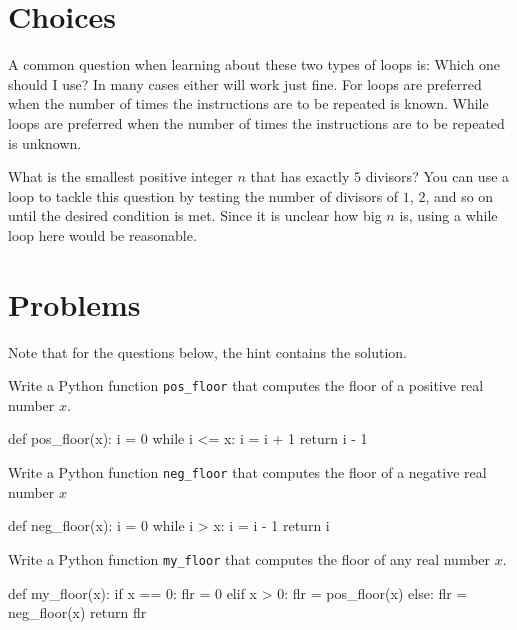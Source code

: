 \documentclass{ximera}
\begin{document}
\section{Choices}

A common question when learning about these two types of loops is: Which one should I use? In many cases either will work just fine. For loops are preferred when the number of times the instructions are to be repeated is known. While loops are preferred when the number of times the instructions are to be repeated is unknown.

What is the smallest positive integer $n$ that has exactly $5$ divisors? You can use a loop to tackle this question by testing the number of divisors of $1$, $2$, and so on until the desired condition is met. Since it is unclear how big $n$ is, using a while loop here would be reasonable.

\section{Problems}

Note that for the questions below, the hint contains the solution.

\begin{question}
	Write a Python function \verb|pos_floor| that computes the floor of a positive real number $x$.
\begin{hint}
\begin{sageCell}
def pos_floor(x):
        i = 0
        while i <= x:
                i = i + 1
        return i - 1
\end{sageCell}
\end{hint}
\end{question}

\begin{question}
	Write a Python function \verb|neg_floor| that computes the floor of a negative real number $x$
\begin{hint}
\begin{sageCell}
def neg_floor(x):
        i = 0
        while i > x:
                i = i - 1
        return i
\end{sageCell}
\end{hint}
\end{question}

\begin{question}
	Write a Python function \verb|my_floor| that computes the floor of any real number $x$.
\begin{hint}
\begin{sageCell}
def my_floor(x):
	if x == 0:
                flr = 0
        elif x > 0:
                flr = pos_floor(x)
        else:
                flr = neg_floor(x)
        return flr
\end{sageCell}
\end{hint}
\end{question}
\end{document}

